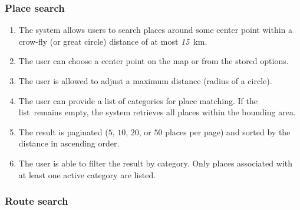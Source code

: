 \subsubsection*{Place search}

\begin{enumerate}[label=\textbf{F\arabic*}]\setcounter{enumi}{0}
\item\label{itm:f-search-places-common} The system allows users to search places around some center point within a crow-fly (or great circle) distance of at most \emph{15}~km.
\item\label{itm:f-search-places-center} The user can choose a center point on the map or from the stored options.
\item\label{itm:f-search-places-dist} The user is allowed to adjust a maximum distance (radius of a circle).
\item\label{itm:f-search-places-cats} The user can provide a list of categories for place matching. If the list~remains empty, the system retrieves all places within the bounding area.
\item\label{itm:f-search-places-list} The result is paginated ($5$, $10$, $20$, or $50$ places per page) and sorted by the distance in ascending order.
\item\label{itm:f-search-places-filter} The user is able to filter the result by category. Only places associated with at least one active category are listed.
\end{enumerate}

\subsubsection*{Route search}

